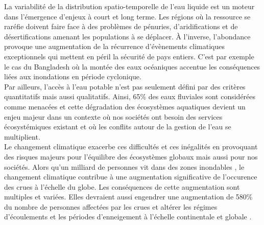 La variabilité de la distribution spatio-temporelle de l'eau liquide est un moteur dans l'émergence d'enjeux à court et long terme. Les régions où la ressource se raréfie doivent faire face à des problèmes de pénuries, d'aridifications et de désertifications amenant les populations à se déplacer. À l'inverse, l'abondance provoque une augmentation de la récurrence d'évènements climatiques exceptionnels qui mettent en péril la sécurité de pays entiers. C'est par exemple le cas du Bangladesh où la montée des eaux océaniques accentue les conséquences liées aux inondations en période cyclonique.\\
Par ailleurs, l'accès à l'eau potable n'est pas seulement défini par des critères quantitatifs mais aussi qualitatifs. Ainsi, 65\% des eaux fluviales sont considérées comme menacées \citep{vorosmarty2010} et cette dégradation des écosystèmes aquatiques devient un enjeu majeur dans un contexte où nos sociétés ont besoin des services écosystémiques existant et où les conflits autour de la gestion de l'eau se multiplient. \\

Le changement climatique exacerbe ces difficultés et ces inégalités en provoquant des risques majeurs pour l'équilibre des écosystèmes globaux mais aussi pour nos sociétés. Alors qu'un milliard de personnes vit dans des zones inondables \citep{di2013}, le changement climatique contribue à une augmentation significative de l'occurence des crues à l'échelle du globe. Les conséquences de cette augmentation sont multiples et variées. Elles devraient aussi engendrer une augmentation de 580\% du nombre de personnes affectées par les crues \citep{alfieri2015} et altérer les régimes d'écoulements et les périodes d'enneigement à l'échelle continentale \citep{schneider2013, forzieri2014, ribes2019} et globale \citep{rodell2018}.\\


